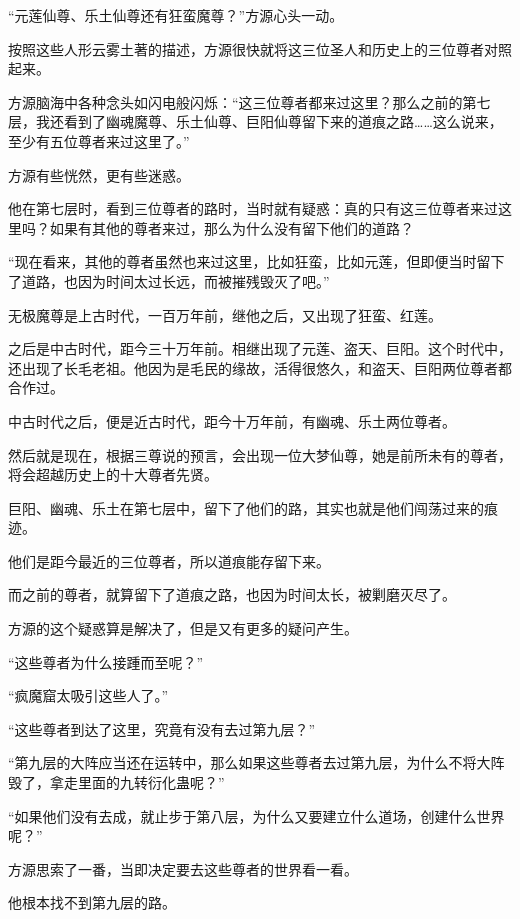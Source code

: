 
\begin{this_body}

“元莲仙尊、乐土仙尊还有狂蛮魔尊？”方源心头一动。

按照这些人形云雾土著的描述，方源很快就将这三位圣人和历史上的三位尊者对照起来。

方源脑海中各种念头如闪电般闪烁：“这三位尊者都来过这里？那么之前的第七层，我还看到了幽魂魔尊、乐土仙尊、巨阳仙尊留下来的道痕之路……这么说来，至少有五位尊者来过这里了。”

方源有些恍然，更有些迷惑。

他在第七层时，看到三位尊者的路时，当时就有疑惑：真的只有这三位尊者来过这里吗？如果有其他的尊者来过，那么为什么没有留下他们的道路？

“现在看来，其他的尊者虽然也来过这里，比如狂蛮，比如元莲，但即便当时留下了道路，也因为时间太过长远，而被摧残毁灭了吧。”

无极魔尊是上古时代，一百万年前，继他之后，又出现了狂蛮、红莲。

之后是中古时代，距今三十万年前。相继出现了元莲、盗天、巨阳。这个时代中，还出现了长毛老祖。他因为是毛民的缘故，活得很悠久，和盗天、巨阳两位尊者都合作过。

中古时代之后，便是近古时代，距今十万年前，有幽魂、乐土两位尊者。

然后就是现在，根据三尊说的预言，会出现一位大梦仙尊，她是前所未有的尊者，将会超越历史上的十大尊者先贤。

巨阳、幽魂、乐土在第七层中，留下了他们的路，其实也就是他们闯荡过来的痕迹。

他们是距今最近的三位尊者，所以道痕能存留下来。

而之前的尊者，就算留下了道痕之路，也因为时间太长，被剿磨灭尽了。

方源的这个疑惑算是解决了，但是又有更多的疑问产生。

“这些尊者为什么接踵而至呢？”

“疯魔窟太吸引这些人了。”

“这些尊者到达了这里，究竟有没有去过第九层？”

“第九层的大阵应当还在运转中，那么如果这些尊者去过第九层，为什么不将大阵毁了，拿走里面的九转衍化蛊呢？”

“如果他们没有去成，就止步于第八层，为什么又要建立什么道场，创建什么世界呢？”

方源思索了一番，当即决定要去这些尊者的世界看一看。

他根本找不到第九层的路。


\end{this_body}
